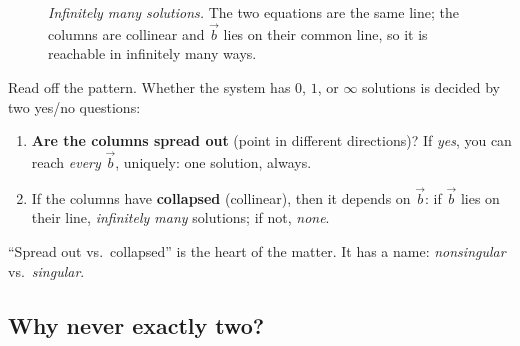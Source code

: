 \begin{figure}[H]
\centering
{}
\caption{\emph{Infinitely many solutions.} The two equations are the same
line; the columns are collinear and $\vec b$ lies on their common line, so it
is reachable in infinitely many ways.}
\label{ch06:inf}
\end{figure}

\begin{focusbox}
Read off the pattern. Whether the system has $0$, $1$, or $\infty$ solutions
is decided by two yes/no questions:
\begin{enumerate}
  \item \textbf{Are the columns spread out} (point in different
  directions)? If \emph{yes}, you can reach \emph{every} $\vec b$, uniquely:
  one solution, always.
  \item If the columns have \textbf{collapsed} (collinear), then it depends
  on $\vec b$: if $\vec b$ lies on their line, \emph{infinitely many}
  solutions; if not, \emph{none}.
\end{enumerate}
``Spread out vs.\ collapsed'' is the heart of the matter. It has a name:
\emph{nonsingular} vs.\ \emph{singular}.
\end{focusbox}

\subsection{Why never exactly two?}

